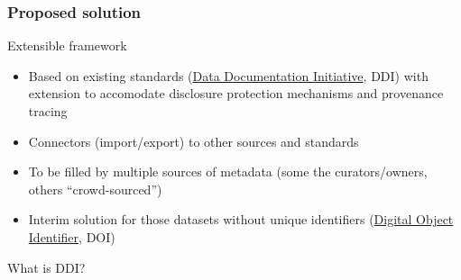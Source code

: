 

\begin{frame}
\frametitle{Proposed solution}
\begin{block}{Extensible framework}
\begin{itemize}[<+->]
\item Based on existing standards (\href{http://www.ddialliance.org}{Data Documentation 
Initiative}, DDI) with \alert<5>{extension to accomodate disclosure protection mechanisms and 
provenance tracing}
\item Connectors (import/export) to other sources and standards
\item To be filled by multiple sources of metadata (some the curators/owners, others ``crowd-sourced'')
\item Interim solution for those datasets without unique identifiers 
(\href{http://datacite.org/whatisdoi}{Digital Object Identifier}, DOI)
\end{itemize}
\end{block}
\end{frame}

\begin{frame}
\vfill 
\centering What is DDI?
\vfill
\end{frame}


